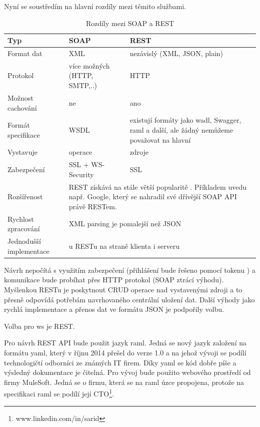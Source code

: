 \documentclass[thesis=B,czech]{FITthesis}[2012/06/26]
\begin{document}
Nyní se soustředím na hlavní rozdíly mezi těmito službami.

\begin{table}\centering
\caption{Rozdíly mezi SOAP a REST}\label{tab:ws_compare}
\begin{tabular}{|p{3cm}|p{3cm}|p{5.5cm}|}\hline
Typ		& SOAP		& REST \tabularnewline \hline \hline
Format dat\cite{ws_compare_swati}		& XML		& nezávislý (XML, JSON, plain) \tabularnewline \hline
Protokol\cite{ws_compare_swati}		& více možných (HTTP, SMTP,..)		& HTTP \tabularnewline \hline
Možnost cachování\cite{ws_compare_swati}		& ne		& ano \tabularnewline \hline	
Formát specifikace\cite{ws_compare_table}\cite{ws_compare_soapui} & WSDL\cite{ws_soap_wsdl}	& existují formáty jako \acrshort{wadl}\cite{ws_wadl}, Swagger\cite{ws_swagger}, \acrshort{raml}\cite{ws_raml} a další, ale žádný nemůžeme považovat na hlavní \cite{ws_comparison} \tabularnewline \hline 		 
Vystavuje\cite{ws_compare_steve}		& operace & zdroje \tabularnewline \hline
Zabezpečení\cite{ws_compare_steve}		& SSL + WS-Security & SSL \tabularnewline \hline  
Rozšířenost\cite{ws_compare_steve}		& \multicolumn{2}{p{8.5cm}|}{REST získává na stále větší popularitě . Příkladem uvedu např. Google, který se nahradil své dřívější SOAP API právě RESTem.}  \tabularnewline \hline 
Rychlost zpracování\cite{ws_compare_armel} 	& \multicolumn{2}{p{8.5cm}|}{XML parsing je pomalejší než JSON}  \tabularnewline \hline 	 		  		
Jednodušší implementace\cite{ws_compare_swati}		&\multicolumn{2}{p{8.5cm}|}{u RESTu na straně klienta i serveru} \tabularnewline \hline 	 				
\end{tabular}
\end{table}

Návrh nepočítá s využitím zabezpečení (přihlášení bude řešeno pomocí tokenu )  a komunikace bude probíhat přes HTTP protokol (SOAP ztrácí výhodu).
Myšlenkou RESTu je poskytnout CRUD\cite{ws_compare_steve} operace nad vystavenými zdroji\cite{ws_crud} a to přesně odpovídá potřebám navrhovaného centrální uložení dat.  Další výhody jako rychlá implementace a přenos dat ve formátu JSON je podpořily volbu. 

Volba pro \acrshort{ws} je REST.

\label{ws_compare_mulesoft}
Pro návrh REST API bude použit jazyk \acrshort{raml}. Jedná se nový jazyk založení na formátu \acrshort{yaml}, který v říjnu 2014 přešel do verze 1.0\cite{ws_raml} a na jehož vývoji se podílí technologičtí odborníci ze známých IT firem\cite{ws_raml_wiki}. Díky \acrshort{yaml} se kód dobře píše a výsledný dokumentace je čitelná. Pro vývoj bude použito webového prostředí od firmy MuleSoft\cite{ws_raml_mulesoft}. Jedná se o firmu, která se na \acrshort{raml} úzce propojena, protože na specifikaci \acrshort{raml} se  podílí její CTO\footnote{www.linkedin.com/in/sarid}.
\vspace*{1\baselineskip}
\end{document}
